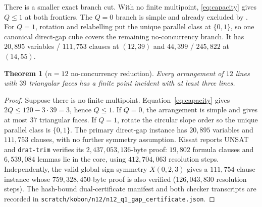 \documentclass[11pt]{article}
\newtheorem{theorem}{Theorem}
\theoremstyle{definition}
\begin{document}
There is a smaller exact branch cut. With no finite multipoint,
\eqref{eq:capacity} gives $Q\le1$ at both frontiers. The $Q=0$ branch is
simple and already excluded by \cite{Blanc}. For $Q=1$, rotation and
relabelling put the unique parallel class at $\{0,1\}$, so one canonical
direct-gap cube covers the remaining no-concurrency branch. It has
$20{,}895$ variables / $111{,}753$ clauses at $(12,39)$ and $44{,}399$ /
$245{,}822$ at $(14,55)$.

\begin{theorem}[$n=12$ no-concurrency reduction]\label{thm:n12q1}
Every arrangement of $12$ lines with $39$ triangular faces has a finite point
incident with at least three lines.
\end{theorem}

\begin{proof}
Suppose there is no finite multipoint. Equation~\eqref{eq:capacity} gives
$2Q\le120-3\cdot39=3$, hence $Q\le1$. If $Q=0$, the arrangement is simple
and \cite[Thm.~3]{Blanc} gives at most $37$ triangular faces. If $Q=1$,
rotate the circular slope order so the unique parallel class is
$\{0,1\}$. The primary direct-gap instance has $20{,}895$ variables and
$111{,}753$ clauses, with no further symmetry assumption. Kissat reports
UNSAT and \texttt{drat-trim} verifies its $2{,}437{,}053{,}136$-byte proof:
$19{,}802$ formula clauses and $6{,}539{,}084$ lemmas lie in the core, using
$412{,}704{,}063$ resolution steps. Independently, the valid global-sign
symmetry $X(0,2,3)$ gives a $111{,}754$-clause instance whose
$759{,}328{,}450$-byte proof is also verified ($126{,}043{,}830$ resolution
steps). The hash-bound dual-certificate manifest and both checker transcripts
are recorded in
\texttt{scratch/kobon/n12/n12\_q1\_gap\_certificate.json}.
\end{proof}
\end{document}
